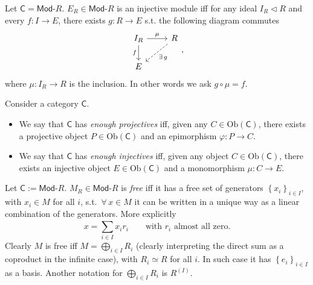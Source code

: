 \begin{prop}
	Let $\mathsf{C} = \mathsf{Mod}\text{-}R$.
	$E_R \in \mathsf{Mod}\text{-}R$ is an injective module iff
	for any ideal $I_R \triangleleft R$ and every $f: I \to E$, there exists $g: R \to E$ s.t.
	the following diagram commutes
	 \begin{equation}
	\begin{tikzcd}
		I_R \arrow[r, "\mu", rightarrow] \arrow[d, "f"', rightarrow] &
		R \arrow[ld, "\exists\, g", dashrightarrow] \\
		E &
	\end{tikzcd}
	,\end{equation} 
	where $\mu: I_R \to R$ is the inclusion.
	In other words we ask $g \circ \mu = f$.
\end{prop} 

\begin{defn}
	Consider a category $\mathsf{C}$.
	\begin{itemize}
		\item We say that $\mathsf{C}$ has {\em enough projectives} iff,
	given any $C \in \mathrm{Ob} \left(\mathsf{C}\right)$, 
	there exists a projective object $P \in \mathrm{Ob} \left(\mathsf{C}\right)$ and an epimorphism $\varphi: P \to C$.
	\item We say that $\mathsf{C}$ has {\em enough injectives} iff, 
		given any object $C \in \mathrm{Ob} \left(\mathsf{C}\right)$,
		there exists an injective object $E \in \mathrm{Ob} \left(\mathsf{C}\right)$ and a monomorphism
		$\mu: C \to E$.
	\end{itemize}
\end{defn}

\begin{defn}
	Let $\mathsf{C} := \mathsf{Mod}\text{-}R$.
	$M_R \in \mathsf{Mod}\text{-}R$ is {\em free} iff it has a free set of generators $\left\{ x_i \right\}_{i \in I}$, 
	with $x_i \in M$ for all $i$, s.t. $\,\forall\, x \in M$ it can be written in a unique way as a linear combination of the generators.
	More explicitly
	\begin{equation}
	x = \sum_{i \in I}^{} x_i r_i \qquad \text{with } r_i \text{ almost all zero}
	.\end{equation} 
	Clearly $M$ is free iff $M = \bigoplus_{i \in I}R_i$
	(clearly interpreting the direct sum as a coproduct in the infinite case),
	with $R_i \simeq R$ for all $i$.
	In such case it has $\left\{ e_i \right\}_{i \in I}$ as a basis.
	Another notation for $\bigoplus_{i \in I} R_i$ is $R^{(I)}$.
\end{defn}

